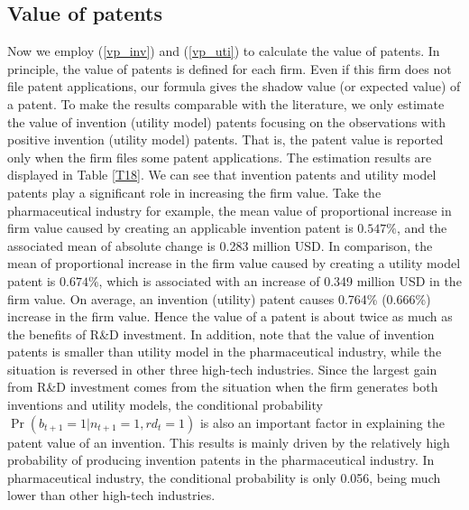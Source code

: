 \documentclass[11pt]{article}
\begin{document}
\subsection{Value of patents}
Now we employ (\ref{vp_inv}) and (\ref{vp_uti}) to calculate the value of patents. In principle, the value of patents is defined for each firm. Even if this firm does not file patent applications, our formula gives the shadow value (or expected value) of a patent. To make the results comparable with the literature, we only estimate the value of invention (utility model) patents focusing on the observations with positive invention (utility model) patents. That is, the patent value is reported only when the firm files some patent applications. The estimation results are displayed in Table \ref{T18}. We can see that invention patents and utility model patents play a significant role in increasing the firm value. Take the pharmaceutical industry for example, the mean value of proportional increase in firm value caused by creating an applicable invention patent is $0.547\%$, and the associated mean of absolute change is 0.283 million USD. In comparison, the mean of proportional increase in the firm value caused by creating a utility model patent is $0.674\%$, which is associated with an increase of 0.349 million USD in the firm value. On average, an invention (utility) patent causes 0.764\% (0.666\%) increase in the firm value. Hence the value of a patent is about twice as much as the benefits of R\&D investment. In addition, note that the value of invention patents is smaller than utility model in the pharmaceutical industry, while the situation is reversed in other three high-tech industries. Since the largest gain from R\&D investment comes from the situation when the firm generates both inventions and utility models, the conditional probability $\Pr(b_{t+1}=1|n_{t+1}=1,rd_{t}=1)$ is also an important factor in explaining the patent value of an invention. This results is mainly driven by the relatively high probability of producing invention patents in the pharmaceutical industry. In pharmaceutical industry, the conditional probability is only 0.056, being much lower than other high-tech industries.
\end{document}
